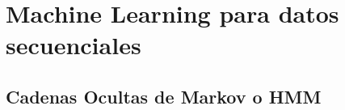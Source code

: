 

\section{Machine Learning para datos secuenciales}
 




\subsection{Cadenas Ocultas de Markov o HMM}
 
